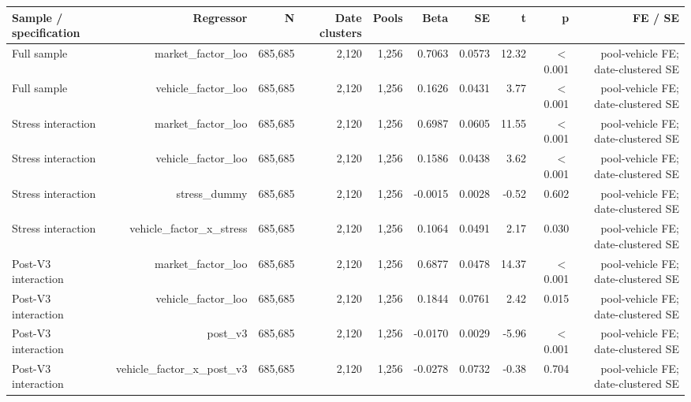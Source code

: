 \begin{tabular}{lrrrrrrrrr}
\toprule
Sample / specification & Regressor & N & Date clusters & Pools & Beta & SE & t & p & FE / SE \\
\midrule
Full sample & market\_factor\_loo & 685,685 & 2,120 & 1,256 & 0.7063 & 0.0573 & 12.32 & \ensuremath{<}0.001 & pool-vehicle FE; date-clustered SE \\
Full sample & vehicle\_factor\_loo & 685,685 & 2,120 & 1,256 & 0.1626 & 0.0431 & 3.77 & \ensuremath{<}0.001 & pool-vehicle FE; date-clustered SE \\
Stress interaction & market\_factor\_loo & 685,685 & 2,120 & 1,256 & 0.6987 & 0.0605 & 11.55 & \ensuremath{<}0.001 & pool-vehicle FE; date-clustered SE \\
Stress interaction & vehicle\_factor\_loo & 685,685 & 2,120 & 1,256 & 0.1586 & 0.0438 & 3.62 & \ensuremath{<}0.001 & pool-vehicle FE; date-clustered SE \\
Stress interaction & stress\_dummy & 685,685 & 2,120 & 1,256 & -0.0015 & 0.0028 & -0.52 & 0.602 & pool-vehicle FE; date-clustered SE \\
Stress interaction & vehicle\_factor\_x\_stress & 685,685 & 2,120 & 1,256 & 0.1064 & 0.0491 & 2.17 & 0.030 & pool-vehicle FE; date-clustered SE \\
Post-V3 interaction & market\_factor\_loo & 685,685 & 2,120 & 1,256 & 0.6877 & 0.0478 & 14.37 & \ensuremath{<}0.001 & pool-vehicle FE; date-clustered SE \\
Post-V3 interaction & vehicle\_factor\_loo & 685,685 & 2,120 & 1,256 & 0.1844 & 0.0761 & 2.42 & 0.015 & pool-vehicle FE; date-clustered SE \\
Post-V3 interaction & post\_v3 & 685,685 & 2,120 & 1,256 & -0.0170 & 0.0029 & -5.96 & \ensuremath{<}0.001 & pool-vehicle FE; date-clustered SE \\
Post-V3 interaction & vehicle\_factor\_x\_post\_v3 & 685,685 & 2,120 & 1,256 & -0.0278 & 0.0732 & -0.38 & 0.704 & pool-vehicle FE; date-clustered SE \\
\bottomrule
\end{tabular}
